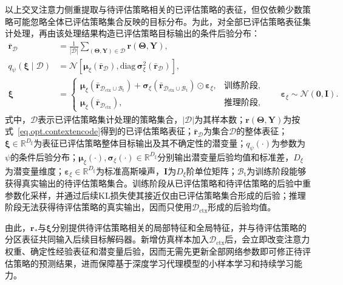 以上交叉注意力侧重提取与待评估策略相关的已评估策略的表征，但仅依赖少数策略可能忽略全体已评估策略集合反映的目标分布。为此，对全部已评估策略表征集计处理，再由该处理结果构造已评估策略目标输出的条件后验分布：
\begin{equation}
\begin{aligned}
\bar{\bm{r}}_{\mathcal{D}}
&=\frac{1}{|\mathcal{D}|}
\sum_{(\bm{\Theta},\bm{Y})\in\mathcal{D}}
\bm{r}(\bm{\Theta},\bm{Y}),\\
q_{\psi}\left(\bm{\xi}\mid\mathcal{D}\right)
&=\mathcal{N}\left[
\bm{\mu}_{\xi}\left(\bar{\bm{r}}_{\mathcal{D}}\right),
\mathrm{diag}\,\bm{\sigma}_{\xi}^{2}\left(\bar{\bm{r}}_{\mathcal{D}}\right)
\right],\\
\bm{\xi}
&=
\begin{cases}
\bm{\mu}_{\xi}\!\left(\bar{\bm{r}}_{\mathcal{D}_{\mathrm{ctx}}\cup\mathcal{B}_{\mathrm{t}}}\right)
+\bm{\sigma}_{\xi}\!\left(\bar{\bm{r}}_{\mathcal{D}_{\mathrm{ctx}}\cup\mathcal{B}_{\mathrm{t}}}\right)
\odot\bm{\varepsilon}_{\xi},
&\text{训练阶段},\\
\bm{\mu}_{\xi}\!\left(\bar{\bm{r}}_{\mathcal{D}_{\mathrm{ctx}}}\right),
&\text{推理阶段},
\end{cases}
\qquad
\bm{\varepsilon}_{\xi}\sim\mathcal{N}(\bm{0},\bm{I}).
\end{aligned}
\label{eq.opt.contextlatent}
\end{equation}
式中，$\mathcal{D}$表示已评估策略集计处理的策略集合，$|\mathcal{D}|$为其样本数；$\bm{r}(\bm{\Theta},\bm{Y})$为按式~\eqref{eq.opt.contextencode}得到的已评估策略表征；$\bar{\bm{r}}_{\mathcal{D}}$为集合$\mathcal{D}$的整体表征；$\bm{\xi}\in\mathbb{R}^{D_{\xi}}$为表征已评估策略整体目标输出及其不确定性的潜变量；$q_{\psi}(\cdot)$为参数为$\psi$的条件后验分布；$\bm{\mu}_{\xi}(\cdot),\bm{\sigma}_{\xi}(\cdot)\in\mathbb{R}^{D_{\xi}}$分别输出潜变量后验均值和标准差，$D_{\xi}$为潜变量维度；$\bm{\varepsilon}_{\xi}\in\mathbb{R}^{D_{\xi}}$为标准高斯噪声，$\bm{I}$为$D_{\xi}$阶单位矩阵；$\mathcal{B}_{\mathrm{t}}$为训练阶段能够获得真实输出的待评估策略集合。训练阶段从已评估策略和待评估策略的后验中重参数化采样，并通过后续KL损失使其接近仅由已评估策略集合形成的后验；推理阶段无法获得待评估策略的真实输出，因而只使用$\mathcal{D}_{\mathrm{ctx}}$形成的后验均值。

由此，$\bm{r}_{*}$与$\bm{\xi}$分别提供待评估策略相关的局部特征和全局特征，并与待评估策略的分区表征共同输入后续目标解码器。新增仿真样本加入$\mathcal{D}_{\mathrm{ctx}}$后，会立即改变注意力权重、确定性经验表征和潜变量后验，因而无需先更新全部网络参数即可修正待评估策略的预测结果，进而保障基于深度学习代理模型的小样本学习和持续学习能力。

